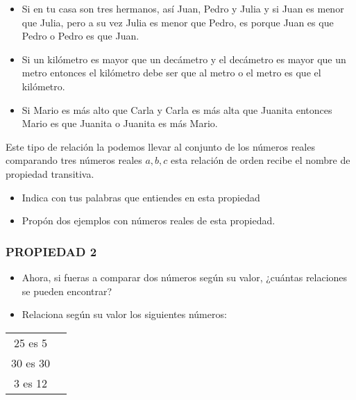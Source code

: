 \documentclass[12pt,a4paper]{article}
\begin{document}
\begin{itemize}
\item Si en tu casa son tres hermanos, así Juan, Pedro y Julia y si Juan es menor que Julia, pero a su vez Julia es menor que Pedro, es porque Juan es \underline{\hspace{2cm}} que Pedro o Pedro es \underline{\hspace{2cm}} que Juan.

\item Si un kilómetro es mayor que un decámetro y el decámetro es mayor que un metro entonces el kilómetro debe ser \underline{\hspace{2cm}} que al metro o el metro es \underline{\hspace{2cm}} que el kilómetro.

\item Si Mario es más alto que Carla y Carla es más alta que Juanita entonces Mario es \underline{\hspace{2cm}} que Juanita o Juanita es más \underline{\hspace{2cm}} Mario.
\end{itemize}

\vspace{0.5cm}

Este tipo de relación la podemos llevar al conjunto de los números reales comparando tres números reales $a,b,c$ esta relación de orden recibe el nombre de propiedad transitiva.

\begin{itemize}
\item Indica con tus palabras que entiendes en esta propiedad
\item Propón dos ejemplos con números reales de esta propiedad.
\end{itemize}

\vspace{1cm}

\subsubsection*{PROPIEDAD 2}

\begin{itemize}
\item Ahora, si fueras a comparar dos números según su valor, ¿cuántas relaciones se pueden encontrar?
\item Relaciona según su valor los siguientes números:
\end{itemize}

\begin{center}
\begin{tabular}{cc}
25 es \underline{\hspace{3cm}} 5 \\
30 es \underline{\hspace{3cm}} 30 \\
3 es \underline{\hspace{3cm}} 12 \\
\end{tabular}
\end{center}
\end{document}
